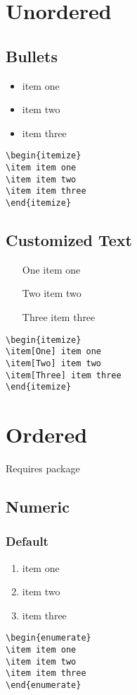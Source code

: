 \documentclass[12pt, letterpaper]{article}
\begin{document}
\section{Unordered}
\subsection{Bullets} 
\begin{itemize}
	\item item one 
	\item item two
	\item item three
\end{itemize}
\begin{lstlisting}
\begin{itemize}
\item item one
\item item two
\item item three
\end{itemize}
\end{lstlisting}

\subsection{Customized Text}
\begin{itemize}
	\item[One] item one 
	\item[Two] item two
	\item[Three] item three
\end{itemize}
\begin{lstlisting}
\begin{itemize}
\item[One] item one 
\item[Two] item two
\item[Three] item three
\end{itemize}
\end{lstlisting}


\section{Ordered}
Requires  package

\subsection{Numeric} 
\subsubsection{Default} 
\begin{enumerate}
	\item item one 
	\item item two
	\item item three
\end{enumerate}
\begin{lstlisting}
\begin{enumerate}
\item item one 
\item item two
\item item three
\end{enumerate}
\end{lstlisting}
\end{document}
